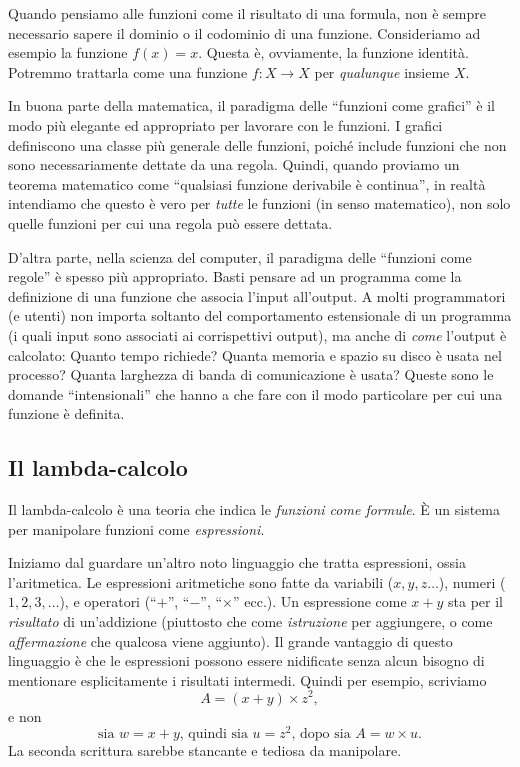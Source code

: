 \documentclass{article}
\begin{document}
Quando pensiamo alle funzioni come il risultato di una formula, non
\`e sempre necessario sapere il dominio o il codominio di una funzione. Consideriamo
ad esempio la funzione $f(x)=x$. Questa \`e, ovviamente, la funzione
identit\`a. Potremmo trattarla come una funzione $f:X\to X$ per {\em qualunque} insieme $X$.

In buona parte della matematica, il paradigma delle 
``funzioni come grafici'' \`e il modo pi\`u elegante ed appropriato per lavorare con le funzioni. 
I grafici definiscono una classe pi\`u generale delle funzioni, poiché include
funzioni che non sono necessariamente dettate da una regola. Quindi, quando
proviamo un teorema matematico come ``qualsiasi funzione derivabile
\`e continua'', in realt\`a intendiamo che questo \`e vero per {\em tutte} le funzioni
(in senso matematico), non solo quelle funzioni per cui una regola pu\`o essere dettata.

D'altra parte, nella scienza del computer, il paradigma delle
``funzioni come regole'' \`e spesso pi\`u appropriato. Basti pensare ad un programma 
come la definizione di una funzione che associa l'input all'output. A molti programmatori
(e utenti) non importa soltanto del comportamento estensionale di 
un programma (i quali input sono associati ai corrispettivi output),
ma  anche di {\em come} l'output \`e calcolato: Quanto tempo richiede?
Quanta memoria e spazio su disco \`e usata nel processo? Quanta larghezza di 
banda di comunicazione \`e usata? Queste sono le domande ``intensionali'' che 
hanno a che fare con il modo particolare
per cui una funzione \`e definita.

\subsection{Il lambda-calcolo}

Il lambda-calcolo \`e una teoria che indica le {\em funzioni come formule}. \`E un
sistema per manipolare funzioni come {\em espressioni}.

Iniziamo dal guardare un'altro noto linguaggio che tratta espressioni, ossia l'aritmetica. 
Le espressioni aritmetiche sono fatte da variabili ($x,y,z\ldots$), 
numeri ($1,2,3,\ldots$), e operatori (``$+$'', ``$-$'', ``$\times$'' ecc.). 
Un espressione come $x+y$ sta per il {\em risultato} di un'addizione
(piuttosto che come {\em istruzione} per aggiungere, o come {\em affermazione} 
che qualcosa viene aggiunto). Il grande vantaggio di questo linguaggio 
\`e che le espressioni possono essere nidificate senza alcun bisogno 
di mentionare esplicitamente i risultati intermedi. Quindi
per esempio, scriviamo
\[   A = (x+y)\times z^2,   
\]
e non 
\[   \mbox{sia $w=x+y$, quindi sia $u=z^2$, dopo sia $A=w\times u$.}    
\]
La seconda scrittura sarebbe stancante e tediosa da manipolare.
\end{document}
